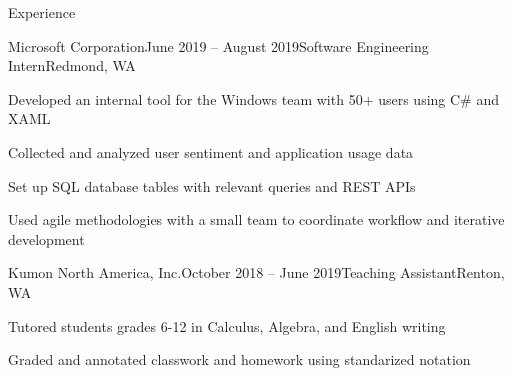 \documentclass{resume} %
\begin{document}

\begin{rSection}{Experience}

\begin{rSubsection}{Microsoft Corporation}{June 2019 – August 2019}{Software Engineering Intern}{Redmond, WA}
\item Developed an internal tool for the Windows team with 50+ users using C\# and XAML
\item Collected and analyzed user sentiment and application usage data
\item Set up SQL database tables with relevant queries and REST APIs
\item Used agile methodologies with a small team to coordinate workflow and iterative development
\end{rSubsection}


\begin{rSubsection}{Kumon North America, Inc.}{October 2018 – June 2019}{Teaching Assistant}{Renton, WA}
\item Tutored students grades 6-12 in Calculus, Algebra, and English writing
\item Graded and annotated classwork and homework using standarized notation
\end{rSubsection}

\end{rSection}

\end{document}
